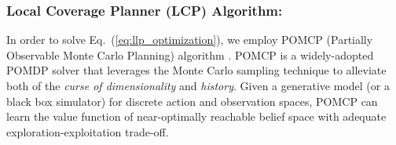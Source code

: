 \documentclass[letterpaper]{article} %
\newcommand{\phdone}[1]{} %
\begin{document}



\subsubsection{Local Coverage Planner (LCP) Algorithm:}\label{sssec:LCP} \hfill
\vspace{-0.25pt}

\noindent
In order to solve Eq.~(\ref{eq:llp_optimization}), we employ POMCP (Partially Observable Monte Carlo Planning) algorithm \cite{silver2010monte}.
POMCP is a widely-adopted POMDP solver that leverages the Monte Carlo sampling technique to alleviate both of the \textit{curse of dimensionality} and \textit{history}.
Given a generative model (or a black box simulator) for discrete action and observation spaces, POMCP can learn the value function of near-optimally reachable belief space with adequate exploration-exploitation trade-off.
\end{document}
